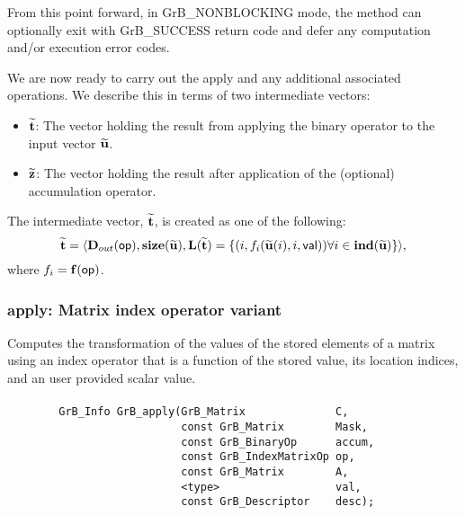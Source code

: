 From this point forward, in {\sf GrB\_NONBLOCKING} mode, the method can 
optionally exit with {\sf GrB\_SUCCESS} return code and defer any computation 
and/or execution error codes.

We are now ready to carry out the apply and any additional 
associated operations.  We describe this in terms of two intermediate vectors:
\begin{itemize}
    \item ${\bf \widetilde{t}}$: The vector holding the result from applying the binary operator to the input vector
    ${\bf \widetilde{u}}$.
    \item ${\bf \widetilde{z}}$: The vector holding the result after 
    application of the (optional) accumulation operator.
\end{itemize}

The intermediate vector, ${\bf \widetilde{t}}$, is created as one of the following:
\[
{\bf \widetilde{t}} = \langle
\mbox{$\mathbf{D}_{out}$}({\sf op}), \bold{size}({\bf \widetilde{u}}),
\bold{L}({\bf \widetilde{t}}) =
\{(i,f_i({\bf \widetilde{u}}(i),i,{\sf val})) \forall i \in \bold{ind}({\bf \widetilde{u}}) \} \rangle,
\]
where $f_{i} = \mathbf{f}({\sf op})$. 






\subsubsection{{\sf apply}: Matrix index operator variant}

Computes the transformation of the values of the stored elements of a matrix
using an index operator that is a function of the stored value, its location 
indices, and an user provided scalar value.

\paragraph{\syntax}

\begin{verbatim}
        GrB_Info GrB_apply(GrB_Matrix              C,
                           const GrB_Matrix        Mask,
                           const GrB_BinaryOp      accum,
                           const GrB_IndexMatrixOp op,
                           const GrB_Matrix        A,
                           <type>                  val,
                           const GrB_Descriptor    desc);
\end{verbatim}


